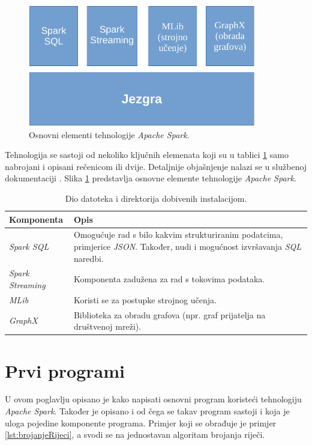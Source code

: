 \documentclass[times, utf8, zavrsni, numeric]{fer}
\begin{document}
\vspace{5mm}
\begin{figure}[htb]
\centering
\includegraphics[width=10cm]{img/gradivniElementiCropped.pdf}
\caption{Osnovni elementi tehnologije \emph{Apache Spark}.}
\label{fig:spark-stack}
\end{figure}
\pagebreak
Tehnologija se sastoji od nekoliko ključnih elemenata koji su u tablici \ref{tbl:gradivniElementi} samo nabrojani i opisani rečenicom ili dvije. Detaljnije objašnjenje nalazi se u službenoj dokumentaciji \cite{officialDocumentation}. Slika \ref{fig:spark-stack} predstavlja osnovne elemente tehnologije \emph{Apache Spark}.

\begin{table}[htb]
\caption{Dio datoteka i direktorija dobivenih instalacijom.}
\label{tbl:gradivniElementi}
\centering
\begin{tabular}{l p{8cm}}
\hline
Komponenta & Opis \\
\hline
\emph{Spark SQL} & Omogućuje rad s bilo kakvim strukturiranim podatcima, primjerice \emph{JSON}. Također, nudi i mogućnost izvršavanja \emph{SQL} naredbi. \\
\emph{Spark Streaming} & Komponenta zadužena za rad s tokovima podataka. \\
\emph{MLib} & Koristi se za postupke strojnog učenja. \\
\emph{GraphX} & Biblioteka za obradu grafova (npr. graf prijatelja na društvenoj mreži).\\
\hline
\end{tabular}
\end{table}

\chapter{Prvi programi}
U ovom poglavlju opisano je kako napisati osnovni program koristeći tehnologiju \emph{Apache Spark}. Također je opisano i od čega se takav program sastoji i koja je uloga pojedine komponente programa. Primjer koji se obrađuje je primjer \ref{lst:brojanjeRijeci}, a svodi se na jednostavan algoritam brojanja riječi.
\end{document}
